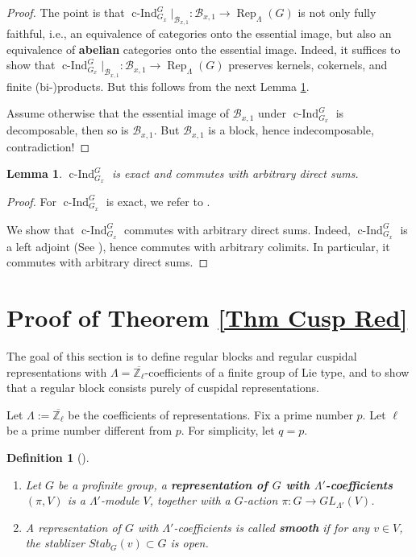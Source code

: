 \documentclass{article}
\newtheorem{lemma}{Lemma}
\newtheorem{definition}{Definition}
\DeclareMathOperator{\cInd}{\operatorname{c-Ind}}
\newcommand{\Rep}{\operatorname{Rep}}
\begin{document}
	\begin{proof}
		The point is that $\cInd_{G_x}^G|_{\mathcal{B}_{x,1}}: \mathcal{B}_{x,1} \to \Rep_{\Lambda}(G)$ is not only fully faithful, i.e., an equivalence of categories onto the essential image, but also an equivalence of \textbf{abelian} categories onto the essential image. Indeed, it suffices to show that $\cInd_{G_x}^G|_{\mathcal{B}_{x,1}}: \mathcal{B}_{x,1} \to \Rep_{\Lambda}(G)$ preserves kernels, cokernels, and finite (bi-)products. But this follows from the next Lemma \ref{Lem Sum}.
		
		Assume otherwise that the essential image of $\mathcal{B}_{x,1}$ under $\cInd_{G_x}^G$ is decomposable, then so is $\mathcal{B}_{x,1}$. But $\mathcal{B}_{x,1}$ is a block, hence indecomposable, contradiction!
	\end{proof}
	
	\begin{lemma}\label{Lem Sum}
		$\cInd_{G_x}^G$ is exact and commutes with arbitrary direct sums.
	\end{lemma}
	
	\begin{proof}
		For $\cInd_{G_x}^G$ is exact, we refer to \cite[I.5.10]{vigneras1996representations}.
		
		We show that $\cInd_{G_x}^G$ commutes with arbitrary direct sums. Indeed, $\cInd_{G_x}^G$ is a left adjoint (See \cite[I.5.7]{vigneras1996representations}), hence commutes with arbitrary colimits. In particular, it commutes with arbitrary direct sums.
	\end{proof}
	
	
	
	
	\section{Proof of Theorem \ref{Thm Cusp Red}}\label{Sec Reg Cusp}
	
	The goal of this section is to define regular blocks and regular cuspidal representations with $\Lambda=\overline{\mathbb{Z}_{\ell}}$-coefficients of a finite group of Lie type, and to show that a regular block consists purely of cuspidal representations.
	
	Let $\Lambda:=\overline{\mathbb{Z}_{\ell}}$ be the coefficients of representations. Fix a prime number $p$. Let $\ell$ be a prime number different from $p$. For simplicity, let $q=p$.
	
	\begin{definition}[{\cite[I.4.1]{vigneras1996representations}}]
		\begin{enumerate}Let $\Lambda'$ be any ring.
			\item Let $G$ be a profinite group, a \textbf{representation of $G$ with $\Lambda'$-coefficients} $(\pi, V)$ is a $\Lambda'$-module $V$, together with a $G$-action $\pi: G \to GL_{\Lambda'}(V)$.
			\item A representation of $G$ with $\Lambda'$-coefficients is called \textbf{smooth} if for any $v \in V$, the stablizer $Stab_G(v) \subset G$ is open.
		\end{enumerate}
	\end{definition}
	
\end{document}
